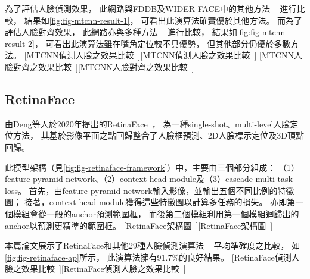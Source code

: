 \documentclass[class=NCU_thesis, crop=false]{standalone}
\begin{document}
為了評估人臉偵測效果，
此網路與FDDB及WIDER FACE中的其他方法
~\cite{yang_aggregate_2014, mathias_face_2014, yan_fastest_2014, yang_facial_2015, chen_joint_2014, li_convolutional_2015, yang_convolutional_2015, farfade_multi-view_2015, yang_wider_2015}
進行比較，
結果如\cref{fig:fig-mtcnn-result-1}，
可看出此演算法確實優於其他方法。
而為了評估人臉對齊效果，
此網路亦與多種方法
~\cite{cao_face_2014, yu_pose-free_2013, xiong_supervised_2013, burgos-artizzu_robust_2013, zhu_face_2012, zhang_facial_2014}
進行比較，
結果如\cref{fig:fig-mtcnn-result-2}，
可看出此演算法雖在嘴角定位較不具優勢，
但其他部分仍優於多數方法。
[MTCNN偵測人臉之效果比較~\cite{zhang_joint_2016}][MTCNN偵測人臉之效果比較~\cite{zhang_joint_2016}]
[MTCNN人臉對齊之效果比較~\cite{zhang_joint_2016}][MTCNN人臉對齊之效果比較~\cite{zhang_joint_2016}]

\subsection{RetinaFace}
由Deng等人於2020年提出的RetinaFace~\cite{deng_retinaface_2020}，
為一種single-shot、multi-level人臉定位方法，
其基於影像平面之點回歸整合了人臉框預測、2D人臉標示定位及3D頂點回歸。

此模型架構（見\cref{fig:fig-retinaface-framework}）中，主要由三個部分組成：
（1）feature pyramid network、（2）context head module及（3）cascade multi-task loss。
首先，由feature pyramid network輸入影像，並輸出五個不同比例的特徵圖；
接著，context head module獲得這些特徵圖以計算多任務的損失。
亦即第一個模組會從一般的anchor預測範圍框，
而後第二個模組利用第一個模組迴歸出的anchor以預測更精準的範圍框。
[RetinaFace架構圖~\cite{deng_retinaface_2020}][RetinaFace架構圖~\cite{deng_retinaface_2020}]

本篇論文展示了RetinaFace和其他29種人臉偵測演算法
~\cite{zhang_single-shot_2019, tang_pyramidbox_2018, najibi_ssh_2017, zhang_s3fd_2017, li_dsfd_2019}
平均準確度之比較，
如\cref{fig:fig-retinaface-ap}所示，
此演算法擁有91.7\%的良好結果。
[RetinaFace偵測人臉之效果比較~\cite{deng_retinaface_2020}][RetinaFace偵測人臉之效果比較~\cite{deng_retinaface_2020}]
\end{document}

